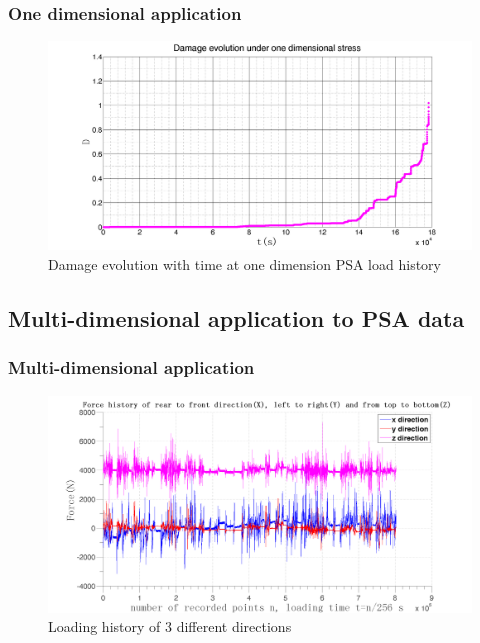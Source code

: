 \documentclass[xcolor=table]{Bredelebeamer}
\begin{document}
\begin{frame}
	\frametitle{One dimensional application}
\begin{figure}[!h]
	\centering
	\includegraphics[width=\textwidth]{figures//damage1d.png} 
	\caption{Damage evolution with time at one dimension PSA load history}
	\label{damage1d}
\end{figure}
\end{frame}	



 \subsection{Multi-dimensional application to PSA data}
\begin{frame}
	\frametitle{Multi-dimensional application}
 \begin{figure}[!h]
 	\centering
 	\includegraphics[width=\textwidth]{figures//xyz.png} 
 	\caption{Loading history of 3 different directions}
 	\label{xyz}
 \end{figure}
\end{frame}	
\end{document}
